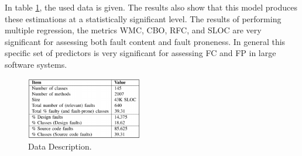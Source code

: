 In table \ref{fig3bn}, the used data is given.
The results also show that this model produces these estimations at a statistically significant level. The results of performing multiple regression, the metrics WMC, CBO, RFC, and SLOC are very significant for assessing both fault content and fault proneness. In general this specific set of predictors is very significant for assessing FC and FP in large software systems.

\begin{figure}[htbp]
	\centerline{\includegraphics[width=0.45\textwidth]{pictures/tableBN.png}}
	\caption{Data Description.}
	\label{fig3bn}
\end{figure}